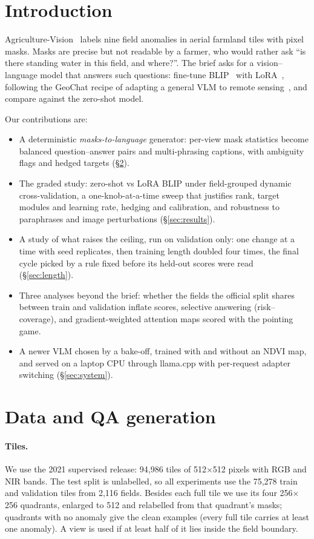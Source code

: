 \documentclass[10pt,twocolumn]{article}
\begin{document}
\section{Introduction}
Agriculture-Vision~\cite{chiu2020agriculture} labels nine field anomalies in aerial farmland tiles with pixel masks. Masks are precise but not readable by a farmer, who would rather ask ``is there standing water in this field, and where?''. The brief asks for a vision--language model that answers such questions: fine-tune BLIP~\cite{li2022blip} with LoRA~\cite{hu2022lora}, following the GeoChat recipe of adapting a general VLM to remote sensing~\cite{kuckreja2024geochat}, and compare against the zero-shot model.

Our contributions are:
\begin{itemize}
\item A deterministic \emph{masks-to-language} generator: per-view mask statistics become balanced question--answer pairs and multi-phrasing captions, with ambiguity flags and hedged targets (\S\ref{sec:data}).
\item The graded study: zero-shot vs LoRA BLIP under field-grouped dynamic cross-validation, a one-knob-at-a-time sweep that justifies rank, target modules and learning rate, hedging and calibration, and robustness to paraphrases and image perturbations (\S\ref{sec:results}).
\item A study of what raises the ceiling, run on validation only: one change at a time with seed replicates, then training length doubled four times, the final cycle picked by a rule fixed before its held-out scores were read (\S\ref{sec:length}).
\item Three analyses beyond the brief: whether the fields the official split shares between train and validation inflate scores, selective answering (risk--coverage), and gradient-weighted attention maps scored with the pointing game.
\item A newer VLM chosen by a bake-off, trained with and without an NDVI map, and served on a laptop CPU through llama.cpp with per-request adapter switching (\S\ref{sec:system}).
\end{itemize}

\section{Data and QA generation}\label{sec:data}
\paragraph{Tiles.} We use the 2021 supervised release: 94,986 tiles of 512$\times$512 pixels with RGB and NIR bands. The test split is unlabelled, so all experiments use the 75,278 train and validation tiles from 2,116 fields. Besides each full tile we use its four 256$\times$256 quadrants, enlarged to 512 and relabelled from that quadrant's masks; quadrants with no anomaly give the clean examples (every full tile carries at least one anomaly). A view is used if at least half of it lies inside the field boundary.
\end{document}
